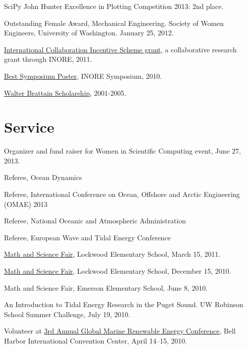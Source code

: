 \documentclass[10pt,letterpaper]{article}
\renewenvironment{itemize}{
  \begin{list}{}{
    \setlength{\leftmargin}{1.5em}
    \setlength{\itemsep}{0.25em}
    \setlength{\parskip}{0pt}
    \setlength{\parsep}{0.25em}
  }
}{
  \end{list}
}
\begin{document}
\begin{itemize}

\item SciPy John Hunter Excellence in Plotting Competition 2013: 2nd place.

\item Outstanding Female Award, Mechanical Engineering. Society of Women Engineers, University of Washington. January 25, 2012.

\item \href{http://inore.org/news/icis_travel_grants/}{International Collaboration Incentive Scheme grant}, a collaborative research grant through INORE, 2011.

\item \href{http://www.inore.org}{Best Symposium Poster}, INORE Symposium, 2010.

\item \href{https://www.whitman.edu/content/catalog/financial-aid}{Walter Brattain Scholarship}, 2001-2005.

%

\end{itemize}

\section*{Service}
\begin{itemize}
  \item Organizer and fund raiser for Women in Scientific Computing event, June 27, 2013.
  \item Referee, Ocean Dynamics
  \item Referee, International Conference on Ocean, Offshore and Arctic Engineering (OMAE) 2013
	\item Referee, National Oceanic and Atmospheric Administration
	\item Referee, European Wave and Tidal Energy Conference
	\item \href{http://www.amath.washington.edu/~siamuw/math-fair.html}{Math and Science Fair}, Lockwood Elementary School, March 15, 2011.
	\item \href{http://www.amath.washington.edu/~siamuw/math-fair.html}{Math and Science Fair}, Lockwood Elementary School, December 15, 2010.
	\item Math and Science Fair, Emerson Elementary School, June 8, 2010.
	\item An Introduction to Tidal Energy Research in the Puget Sound. UW Robinson School Summer Challenge, July 19, 2010.
	\item Volunteer at \href{http://www.globalmarinerenewable.com/}{3rd Annual Global Marine Renewable Energy Conference},  Bell Harbor International Convention Center,  April 14--15, 2010.
\end{itemize}
\end{document}
